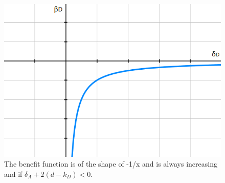 \begin{figure}
\centering
\includegraphics[scale=0.5]{Images/ShapeDown.png} 
\caption{The benefit function is of the shape of -1/x and is always increasing and if $\delta_{A} + 2(d-k_{D}) < 0$.}
\label{ShapeDown}
\end{figure}
%
~~\\

